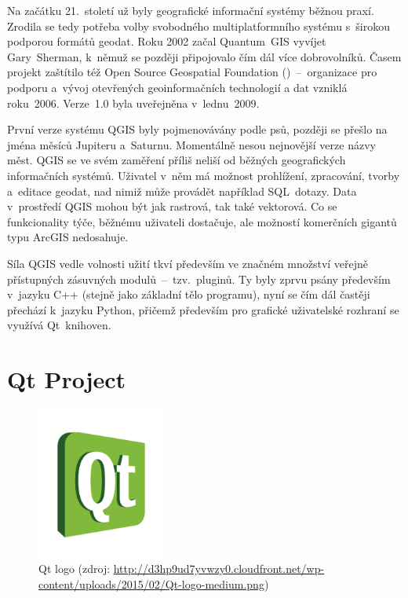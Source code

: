 Na začátku 21.~století už byly geografické informační systémy běžnou praxí. Zrodila se tedy potřeba volby svobodného multiplatformního systému s~širokou podporou formátů geodat. Roku 2002 začal Quantum~GIS vyvíjet Gary~Sherman, k~němuž se později připojovalo čím dál více dobrovolníků. Časem projekt zaštítilo též Open Source Geospatial Foundation ()~–~organizace pro podporu a~vývoj otevřených geoinformačních technologií a dat vzniklá roku~2006. Verze~1.0 byla uveřejněna v~lednu~2009. 

První verze systému QGIS byly pojmenovávány podle psů, později se přešlo na jména měsíců Jupiteru a~Saturnu. Momentálně nesou nejnovější verze názvy měst. 
QGIS se ve svém zaměření příliš neliší od běžných geografických informačních systémů. Uživatel v~něm má možnost prohlížení, zpracování, tvorby a~editace geodat, nad nimiž může provádět například SQL~dotazy. Data v~prostředí QGIS mohou být jak rastrová, tak také vektorová. Co se funkcionality týče, běžnému uživateli dostačuje, ale možností komerčních gigantů typu ArcGIS nedosahuje. 

Síla QGIS vedle volnosti užití tkví především ve značném množství veřejně přístupných zásuvných modulů~–~tzv.~pluginů. Ty byly zprvu psány především v~jazyku C++ (stejně jako základní tělo programu), nyní se čím dál častěji přechází k~jazyku Python, přičemž především pro grafické uživatelské rozhraní se využívá Qt~knihoven. 



\section{Qt Project}
\label{qt}

  \begin{figure}[H]
    \centering
      \includegraphics[width=120pt]{./pictures/qt.png}
      \caption[Qt logo]{Qt logo 
      (zdroj: \url{http://d3hp9ud7yvwzy0.cloudfront.net/wp-content/uploads/2015/02/Qt-logo-medium.png})}
      \label{fig:qt}
  \end{figure}

